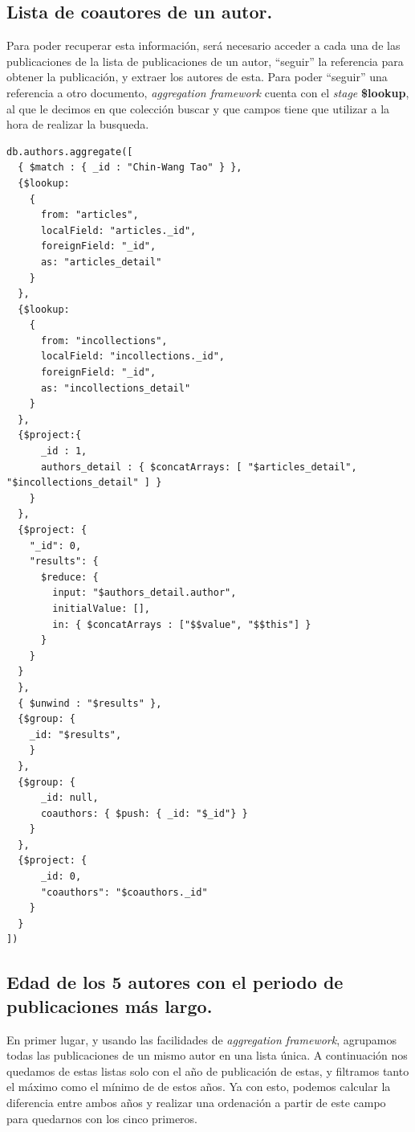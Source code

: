 \subsection{Lista de coautores de un autor.}

Para poder recuperar esta información, será necesario acceder a cada una de las publicaciones de la lista de publicaciones de un autor, ``seguir'' la referencia para obtener la publicación, y extraer los autores de esta. Para poder ``seguir'' una referencia a otro documento, \textit{aggregation framework} cuenta con el \textit{stage} \textbf{\$lookup}, al que le decimos en que colección buscar y que campos tiene que utilizar a la hora de realizar la busqueda.

\begin{verbatim}
db.authors.aggregate([
  { $match : { _id : "Chin-Wang Tao" } },
  {$lookup:
    {
      from: "articles",
      localField: "articles._id",
      foreignField: "_id",
      as: "articles_detail"
    }
  },
  {$lookup:
    {
      from: "incollections",
      localField: "incollections._id",
      foreignField: "_id",
      as: "incollections_detail"
    }
  },
  {$project:{
      _id : 1,
      authors_detail : { $concatArrays: [ "$articles_detail", "$incollections_detail" ] }
    } 
  },
  {$project: {
    "_id": 0,
    "results": {
      $reduce: {
        input: "$authors_detail.author",
        initialValue: [],
        in: { $concatArrays : ["$$value", "$$this"] }
      }
    }
  }
  },
  { $unwind : "$results" },
  {$group: {
    _id: "$results",
    }
  },
  {$group: {
      _id: null,
      coauthors: { $push: { _id: "$_id"} }
    }
  },
  {$project: {
      _id: 0,
      "coauthors": "$coauthors._id"
    }
  }
])
\end{verbatim}


\subsection{Edad de los 5 autores con el periodo de publicaciones más largo.}

En primer lugar, y usando las facilidades de  \textit{aggregation framework}, agrupamos todas las publicaciones de un mismo autor en una lista única. A continuación nos quedamos de estas listas solo con el año de publicación de estas, y filtramos tanto el máximo como el mínimo de de estos años. Ya con esto, podemos calcular la diferencia entre ambos años y realizar una ordenación a partir de este campo para quedarnos con los cinco primeros.

